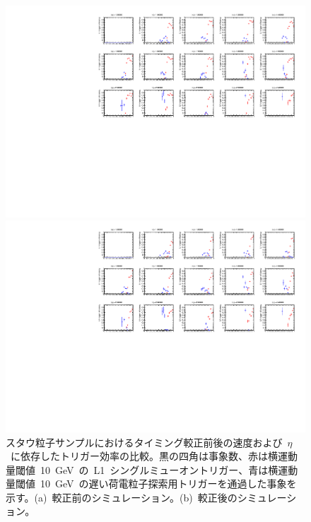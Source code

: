 \begin{figure}[H]
    \begin{minipage}{0.49\hsize}
    \centering   
    \includegraphics[width=\textwidth,page=16]{img/rec/stau_600_ori.pdf}
    \subcaption{}
    \end{minipage}
    \begin{minipage}{0.49\hsize}
    \centering   
    \includegraphics[width=\textwidth,page=16]{img/rec/stau_600.pdf}
    \subcaption{}
    \end{minipage}
    \caption[スタウ粒子サンプルにおけるタイミング較正前後の速度および~$\eta$~に依存したトリガー効率の比較]{スタウ粒子サンプルにおけるタイミング較正前後の速度および~$\eta$~に依存したトリガー効率の比較。黒の四角は事象数、赤は横運動量閾値~10~GeV~の~L1~シングルミューオントリガー、青は横運動量閾値~10~GeV~の遅い荷電粒子探索用トリガーを通過した事象を示す。(a)~較正前のシミュレーション。(b)~較正後のシミュレーション。}\label{fig:trietabeta}
\end{figure}

